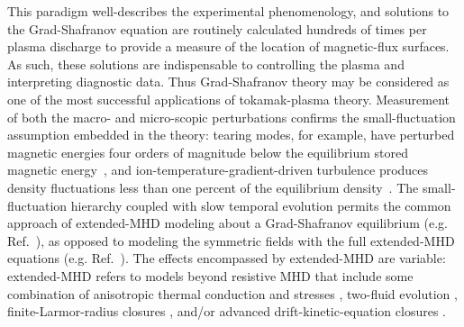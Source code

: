 \documentclass[english,aps,superscriptaddress,showkeys,showpacs,prepri,twocolumn]{revtex4}
\begin{document}
This paradigm well-describes the experimental phenomenology, and solutions to
the Grad-Shafranov equation are routinely calculated hundreds of times per
plasma discharge to provide a measure of the location of magnetic-flux
surfaces.  As such, these solutions are indispensable to controlling the plasma
and interpreting diagnostic data.  Thus Grad-Shafranov theory may be considered
as one of the most successful applications of tokamak-plasma theory.
Measurement of both the macro- and micro-scopic perturbations confirms the
small-fluctuation assumption embedded in the theory: tearing modes, for
example, have perturbed magnetic energies four orders of magnitude below the
equilibrium stored magnetic energy~\cite{sauter}, and ion-temperature-gradient-driven turbulence
produces density fluctuations less than one percent of the equilibrium
density~\cite{white2008measurements}. The small-fluctuation hierarchy coupled
with slow temporal evolution permits the common approach of extended-MHD
modeling about a Grad-Shafranov equilibrium (e.g. Ref.~\cite{King16qh}), as
opposed to modeling the symmetric fields with the full extended-MHD
equations (e.g.  Ref.~\cite{Ferraro09}). The effects encompassed by
extended-MHD are variable: extended-MHD refers to models beyond resistive MHD
that include some combination of anisotropic thermal conduction and stresses
\cite{sovinec04}, two-fluid evolution \cite{Sovinec10}, finite-Larmor-radius
closures \cite{Schnack06,King11}, and/or advanced drift-kinetic-equation closures \cite{held15}.

%
\end{document}
